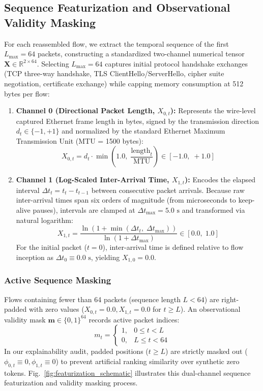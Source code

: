 \documentclass[conference]{IEEEtran}
\begin{document}
\subsection{Sequence Featurization and Observational Validity Masking}
\label{sec:featurization}
For each reassembled flow, we extract the temporal sequence of the first $L_{\max} = 64$ packets, constructing a standardized two-channel numerical tensor $\mathbf{X} \in \mathbb{R}^{2 \times 64}$. Selecting $L_{\max} = 64$ captures initial protocol handshake exchanges (TCP three-way handshake, TLS ClientHello/ServerHello, cipher suite negotiation, certificate exchange) while capping memory consumption at 512 bytes per flow:
\begin{enumerate}
    \item \textbf{Channel 0 (Directional Packet Length, $X_{0, t}$):} Represents the wire-level captured Ethernet frame length in bytes, signed by the transmission direction $d_t \in \{-1, +1\}$ and normalized by the standard Ethernet Maximum Transmission Unit (MTU = 1500 bytes):
    \begin{equation}
    X_{0, t} = d_t \cdot \min\left(1.0, \; \frac{\text{length}_t}{\text{MTU}}\right) \in [-1.0, \; +1.0]
    \label{eq:feat_len}
    \end{equation}
    \item \textbf{Channel 1 (Log-Scaled Inter-Arrival Time, $X_{1, t}$):} Encodes the elapsed interval $\Delta t_t = t_t - t_{t-1}$ between consecutive packet arrivals. Because raw inter-arrival times span six orders of magnitude (from microseconds to keep-alive pauses), intervals are clamped at $\Delta t_{\max} = 5.0\text{ s}$ and transformed via natural logarithm:
    \begin{equation}
    X_{1, t} = \frac{\ln(1 + \min(\Delta t_t, \; \Delta t_{\max}))}{\ln(1 + \Delta t_{\max})} \in [0.0, \; 1.0]
    \label{eq:feat_iat}
    \end{equation}
    For the initial packet ($t = 0$), inter-arrival time is defined relative to flow inception as $\Delta t_0 \equiv 0.0\text{ s}$, yielding $X_{1, 0} = 0.0$.
\end{enumerate}

\subsubsection{Active Sequence Masking}
Flows containing fewer than 64 packets (sequence length $L < 64$) are right-padded with zero values ($X_{0, t} = 0.0, X_{1, t} = 0.0$ for $t \ge L$). An observational validity mask $\mathbf{m} \in \{0, 1\}^{64}$ records active packet indices:
\begin{equation}
m_t = \begin{cases} 1, & 0 \le t < L \\ 0, & L \le t < 64 \end{cases}
\label{eq:mask}
\end{equation}
In our explainability audit, padded positions ($t \ge L$) are strictly masked out ($\phi_{0, t} \equiv 0, \phi_{1, t} \equiv 0$) to prevent artificial ranking similarity over synthetic zero tokens. Fig.~\ref{fig:featurization_schematic} illustrates this dual-channel sequence featurization and validity masking process.
\end{document}
